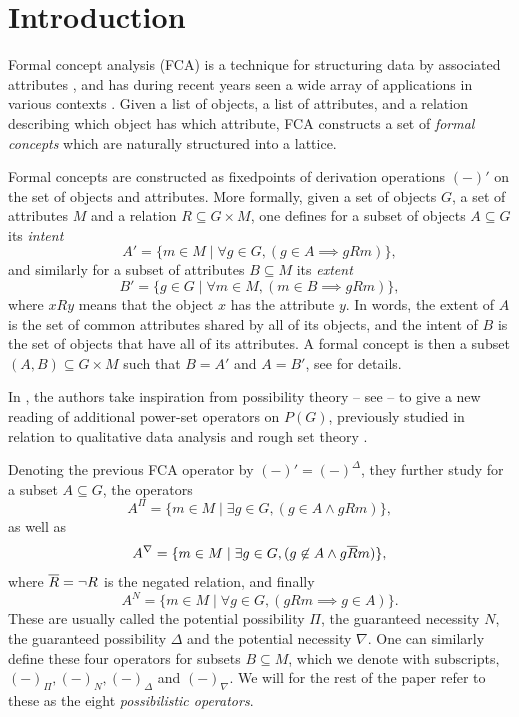 

\section{Introduction}

Formal concept analysis (FCA) is a technique for structuring data by associated attributes \cite{ganter-wille_1999}, and has during recent years seen a wide array of applications in various contexts \cite{singh-kumar-gani_2016}. Given a list of objects, a list of attributes, and a relation describing which object has which attribute, FCA constructs a set of \emph{formal concepts} which are naturally structured into a lattice. 

Formal concepts are constructed as fixedpoints of derivation operations $(-)'$ on the set of objects and attributes. More formally, given a set of objects $G$, a set of attributes $M$ and a relation $R\subseteq G\times M$, one defines for a subset of objects $A\subseteq G$ its \emph{intent}
\[A' = \{m \in M \mid \forall g\in G, (g\in A \implies gRm)\},\]
and similarly for a subset of attributes $B\subseteq M$ its \emph{extent}
\[B' = \{g \in G \mid \forall m \in M, (m\in B \implies gRm)\},\]
where $xRy$ means that the object $x$ has the attribute $y$. In words, the extent of $A$ is the set of common attributes shared by all of its objects, and the intent of $B$ is the set of objects that have all of its attributes. A formal concept is then a subset $(A,B)\subseteq G\times M$ such that $B=A'$ and $A=B'$, see \cite{ganter-wille_1999} for details. 

In \cite{dubois-dupin-prade_2007, dubois-prade_2009}, the authors take inspiration from possibility theory -- see \cite{dubois-prade_1988, dubois-prade_1998, dubois-prade_2015} -- to give a new reading of additional power-set operators on $P(G)$, previously studied in relation to qualitative data analysis \cite{duntsch-gediga_2002} and rough set theory \cite{yao-chen_2006}. 

Denoting the previous FCA operator by $(-)' = (-)^\Delta$, they further study for a subset $A\subseteq G$, the operators 
\[A^\Pi = \{m \in M \mid \exists g\in G, (g\in A \wedge gRm)\},\]
as well as
\[A^\nabla = \{m\in M \mid \exists g\in G, (g\not\in A \wedge g\overline{R} m)\},\]
where $\overline{R} = \neg R$ is the negated relation, and finally
\[A^N = \{m\in M \mid \forall g\in G, (gRm \implies g\in A)\}.\]
These are usually called the potential possibility $\Pi$, the guaranteed necessity $N$, the guaranteed possibility $\Delta$ and the potential necessity $\nabla$. One can similarly define these four operators for subsets $B\subseteq M$, which we denote with subscripts, $(-)_\Pi, (-)_N, (-)_\Delta$ and $(-)_\nabla$. We will for the rest of the paper refer to these as the eight \emph{possibilistic operators}.  

